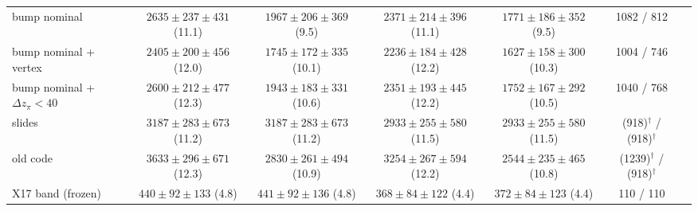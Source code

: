 \begin{table}[H]
{\begin{tabular}{lcccccc}
\midrule
bump nominal & $2635\pm237\pm431$ (11.1) & $1967\pm206\pm369$ (9.5) & $2371\pm214\pm396$ (11.1) & $1771\pm186\pm352$ (9.5) & 1082 / 812 \\
bump nominal + vertex & $2405\pm200\pm456$ (12.0) & $1745\pm172\pm335$ (10.1) & $2236\pm184\pm428$ (12.2) & $1627\pm158\pm300$ (10.3) & 1004 / 746 \\
bump nominal + $\Delta z_\pi<40$ & $2600\pm212\pm477$ (12.3) & $1943\pm183\pm331$ (10.6) & $2351\pm193\pm445$ (12.2) & $1752\pm167\pm292$ (10.5) & 1040 / 768 \\
\midrule
slides & $3187\pm283\pm673$ (11.2) & $3187\pm283\pm673$ (11.2) & $2933\pm255\pm580$ (11.5) & $2933\pm255\pm580$ (11.5) & (918)$^\dagger$ / (918)$^\dagger$ \\
old code & $3633\pm296\pm671$ (12.3) & $2830\pm261\pm494$ (10.9) & $3254\pm267\pm594$ (12.2) & $2544\pm235\pm465$ (10.8) & (1239)$^\dagger$ / (918)$^\dagger$ \\
\midrule
X17 band (frozen) & $440\pm92\pm133$ (4.8) & $441\pm92\pm136$ (4.8) & $368\pm84\pm122$ (4.4) & $372\pm84\pm123$ (4.4) & 110 / 110 \\
\bottomrule
\end{tabular}}
\end{table}
